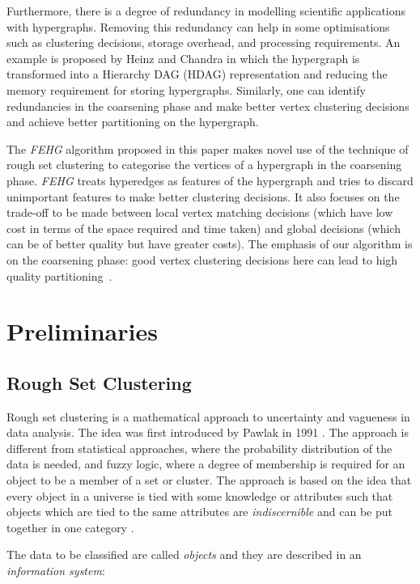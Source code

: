 \documentclass[twocolumn]{svjour3}          \smartqed
\begin{document}
Furthermore, there is a degree of redundancy in modelling scientific applications with hypergraphs. Removing this redundancy can help in some optimisations such as clustering decisions, storage overhead, and processing requirements. An example is proposed by Heinz and Chandra \cite{bey2014} in which the hypergraph is transformed into a Hierarchy DAG (HDAG) representation and reducing the memory requirement for storing hypergraphs. Similarly, one can identify redundancies in the coarsening phase and make better vertex clustering decisions and achieve better partitioning on the hypergraph. 

The \textit{FEHG} algorithm proposed in this paper makes novel use of the technique of rough set clustering to categorise the vertices of a hypergraph in the coarsening phase. \textit{FEHG} treats hyperedges as features of the hypergraph and tries to discard unimportant features to make better clustering decisions. It also focuses on the trade-off to be made between local vertex matching decisions (which have low cost in terms of the space required and time taken) and global decisions (which can be of better quality but have greater costs). The emphasis of our algorithm is on the coarsening phase: good vertex clustering decisions here can lead to high quality partitioning~\cite{karytech2002}. 

\section{Preliminaries}\label{sec:preliminaries}

\subsection{Rough Set Clustering}\label{sec:rough_sets}

Rough set clustering is a mathematical approach to uncertainty and vagueness in data analysis. The idea was first introduced by Pawlak in 1991 \cite{pawlak1991}. The approach is different from statistical approaches, where the probability distribution of the data is needed, and fuzzy logic, where a degree of membership is required for an object to be a member of a set or cluster. The approach is based on the idea that every object in a universe is tied with some knowledge or attributes such that objects which are tied to the same attributes are \textit{indiscernible} and can be put together in one category \cite{pawlak2005rough}. 


The data to be classified are called \textit{objects} and they are described in an \textit{information system}:
\end{document}
